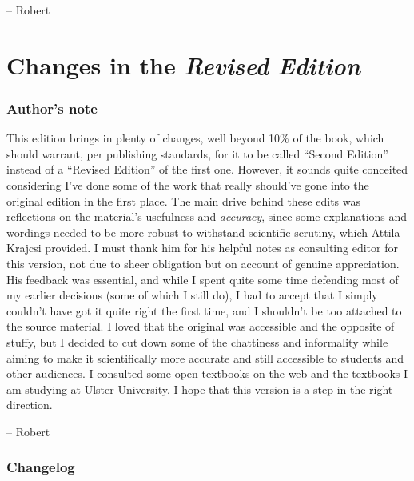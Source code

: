 \documentclass[
  11pt,
]{book}
\theoremstyle{definition}
\theoremstyle{definition}
\theoremstyle{definition}
\theoremstyle{definition}
\theoremstyle{remark}
\begin{document}
-- Robert

\hypertarget{changes-in-the-revised-edition}{%
\section*{\texorpdfstring{Changes in the \emph{Revised Edition}}{Changes in the Revised Edition}}\label{changes-in-the-revised-edition}}

\hypertarget{authors-note}{%
\subsubsection*{Author's note}\label{authors-note}}

This edition brings in plenty of changes, well beyond 10\% of the book, which should warrant, per publishing standards, for it to be called ``Second Edition'' instead of a ``Revised Edition'' of the first one. However, it sounds quite conceited considering I've done some of the work that really should've gone into the original edition in the first place. The main drive behind these edits was reflections on the material's usefulness and \emph{accuracy}, since some explanations and wordings needed to be more robust to withstand scientific scrutiny, which Attila Krajcsi provided. I must thank him for his helpful notes as consulting editor for this version, not due to sheer obligation but on account of genuine appreciation. His feedback was essential, and while I spent quite some time defending most of my earlier decisions (some of which I still do), I had to accept that I simply couldn't have got it quite right the first time, and I shouldn't be too attached to the source material. I loved that the original was accessible and the opposite of stuffy, but I decided to cut down some of the chattiness and informality while aiming to make it scientifically more accurate and still accessible to students and other audiences. I consulted some open textbooks on the web and the textbooks I am studying at Ulster University. I hope that this version is a step in the right direction.

-- Robert

\hypertarget{changelog}{%
\subsubsection*{Changelog}\label{changelog}}
\end{document}
